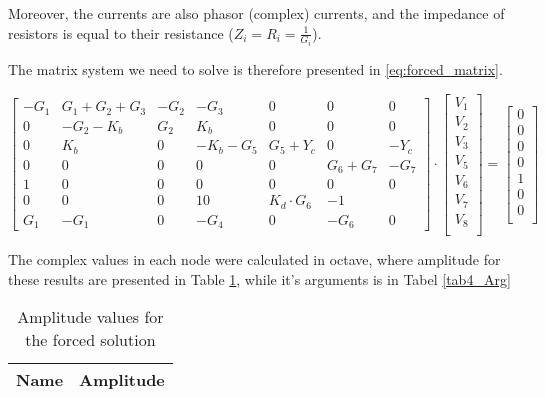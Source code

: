 Moreover, the currents are also phasor (complex) currents, and the impedance of resistors is equal to their resistance ($Z_i = R_i = \frac{1}{G_i}$).

The matrix system we need to solve is therefore presented in \ref{eq:forced_matrix}.

\begin{equation}
    \begin{bmatrix}
        -G_1 & G_1+G_2+G_3 & -G_2 & -G_3 & 0 & 0 & 0\\
        0 & -G_2-K_b & G_2 & K_b & 0 & 0 & 0\\ 
        0 & K_b & 0 & -K_b-G_5 & G_5+Y_c & 0 & -Y_c\\
        0 & 0 & 0 & 0 & 0 & G_6+G_7 & -G_7\\
        1 & 0 & 0 & 0 & 0 & 0 & 0\\
        0 & 0 & 0 & 1 0 & K_d \cdot G_6 & -1\\
        G_1 & -G_1 & 0 & -G_4 & 0 & -G_6 & 0
    \end{bmatrix}
    \cdot
    \begin{bmatrix}
    V_1\\
    V_2\\
    V_3\\
    V_5\\
    V_6\\
    V_7\\
    V_8\\
    \end{bmatrix}
    =
    \begin{bmatrix}
    0\\0\\0\\0\\1\\0\\0\\
    \end{bmatrix}
    \label{eq:forced_matrix}
\end{equation}

The complex values in each node were calculated in octave, where amplitude for these results are presented in Table \ref{tab4_Amp}, while it's arguments is in Tabel \ref{tab4_Arg}


\begin{table}[!ht]
  \centering
  \begin{tabular}{|l|r|}
    \hline    
    {\bf Name} & {\bf Amplitude} \\ \hline
    
  \end{tabular}
  \caption{Amplitude values for the forced solution}
  \label{tab4_Amp}
\end{table}


